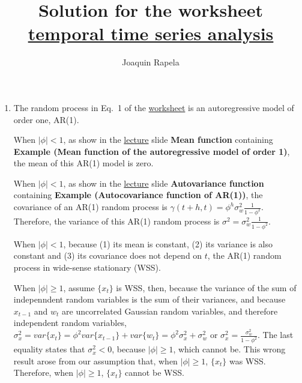 \documentclass[12pt]{article}
\title{Solution for the worksheet
\href{https://github.com/joacorapela/statNeuro2025/blob/master/worksheets/01_temporalTimeSeriesAnalysis/worksheet_temporalTimeSeriesAnalysis.pdf}{temporal time series analysis}}
\author{Joaquin Rapela}
\begin{document}
\maketitle

\begin{enumerate}

    \item The random process in Eq.~1 of the
        \href{https://github.com/joacorapela/statNeuro2025/blob/master/worksheets/01_temporalTimeSeriesAnalysis/worksheet_temporalTimeSeriesAnalysis.pdf}
        {worksheet} is an autoregressive model of order one, AR(1).

        When $|\phi|<1$, as show in the \href{https://github.com/joacorapela/statNeuro2025/blob/master/lectures/01_temporalTimeSeriesAnalysis/temporalTimeSeriesAnalysis.pdf}{lecture} slide \textbf{Mean function} containing \textbf{Example
        (Mean function of the autoregressive model of order 1)}, the mean of this AR(1)
        model is zero.

        When $|\phi|<1$, as show in the \href{https://github.com/joacorapela/statNeuro2025/blob/master/lectures/01_temporalTimeSeriesAnalysis/temporalTimeSeriesAnalysis.pdf}{lecture} slide \textbf{Autovariance function}
        containing \textbf{Example (Autocovariance function of AR(1))}, the
        covariance of an AR(1) random process is $\gamma(t+h,
        t)=\phi^h\sigma_w^2\frac{1}{1-\phi^2}$.
        Therefore, the variance of this AR(1) random process is
        $\sigma^2=\sigma_w^2\frac{1}{1-\phi^2}$.

        When $|\phi|<1$, because (1) its mean is constant, (2) its variance is also constant and
        (3) its covariance does not depend on $t$, the AR(1) random process in
        wide-sense stationary (WSS).

        When $|\phi|\ge 1$, assume $\{x_t\}$ is WSS, then, because the variance
        of the sum of indepenndent random variables is the sum of their
        variances, and because $x_{t-1}$ and $w_t$ are uncorrelated Gaussian
        random variables, and therefore independent random variables,
        $\sigma^2_x=var\{x_t\}=\phi^2var\{x_{t-1}\}+var\{w_t\}=\phi^2\sigma^2_x+\sigma^2_w$
        or $\sigma^2_x=\frac{\sigma^2_w}{1-\phi^2}$. The last equality states
        that $\sigma^2_x<0$, because $|\phi|\ge 1$, which cannot be. This wrong
        result arose from our assumption that, when $|\phi|\ge 1$, $\{x_t\}$ was
        WSS. Therefore, when $|\phi|\ge 1$, $\{x_t\}$ cannot be WSS.


\end{enumerate}
\end{document}
